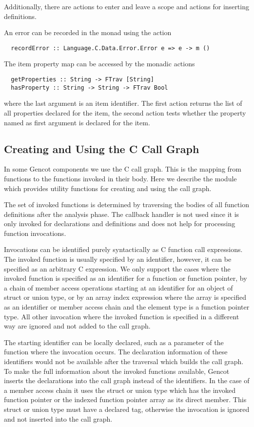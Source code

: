 Additionally, there are actions to enter and leave a scope and actions for inserting definitions.

An error can be recorded in the monad using the action
\begin{verbatim}
  recordError :: Language.C.Data.Error.Error e => e -> m () 
\end{verbatim}

The item property map can be accessed by the monadic actions
\begin{verbatim}
  getProperties :: String -> FTrav [String]
  hasProperty :: String -> String -> FTrav Bool
\end{verbatim}
where the last  argument is an item identifier. The first action returns the list of all properties declared 
for the item, the second action tests whether the property named as first argument is declared for the item.

\subsection{Creating and Using the C Call Graph}
\label{impl-ccode-callgraph}

In some Gencot components we use the C call graph. This is the mapping from functions to the functions
invoked in their body. Here we describe the module  which provides
utility functions for creating and using the call graph.

The set of invoked functions is determined by traversing the bodies of all function definitions after the analysis
phase. The callback handler is not used since it is only invoked for declarations and definitions and does not help
for processing function invocations.

Invocations can be identified purely syntactically as C function call expressions. The invoked function is usually 
specified by an identifier, however, it can be specified as an arbitrary C expression. We only support the cases
where the invoked function is specified as an identifier for a function or function pointer, by a chain of 
member access operations starting at an identifier for an object of struct or union type, or by an array index
expression where the array is specified as an identifier or member access chain and the element type is a function
pointer type. All other invocation where the invoked function is specified in a different way are ignored and not 
added to the call graph.

The starting identifier can be locally declared, such as a parameter of the function where the invocation occurs. The 
declaration information of these identifiers would not be available after the traversal which builds the call graph.
To make the full information about the invoked functions available, Gencot inserts the declarations into the call graph 
instead of the identifiers. In the case of a member access chain it uses the struct or union type which has the 
invoked function pointer or the indexed function pointer array as its direct member. This struct or union type
must have a declared tag, otherwise the invocation is ignored and not inserted into the call graph.

